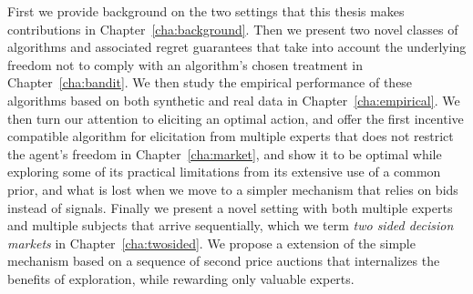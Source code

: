 First we provide background on the two settings that this thesis makes contributions in  Chapter~\ref{cha:background}. Then we present two novel classes of algorithms and associated regret guarantees that take into account the underlying freedom not to comply with an algorithm's chosen treatment in Chapter~\ref{cha:bandit}. We then study the empirical performance  of these algorithms based on both synthetic and real data in Chapter~\ref{cha:empirical}.
We then turn our attention to eliciting an optimal action, and offer the first incentive compatible algorithm for elicitation from multiple experts that does not restrict the agent's freedom in Chapter~\ref{cha:market}, and show it to be optimal while exploring some of its practical limitations from its extensive use of a common prior, and what is lost when we move to a simpler mechanism that relies on bids instead of signals.
Finally we present a novel setting with both multiple experts and multiple subjects that arrive sequentially, which we term \emph{two sided decision markets} in Chapter~\ref{cha:twosided}. We propose a extension of the simple mechanism based on a sequence of second price auctions that internalizes the benefits of exploration, while rewarding only valuable experts.

